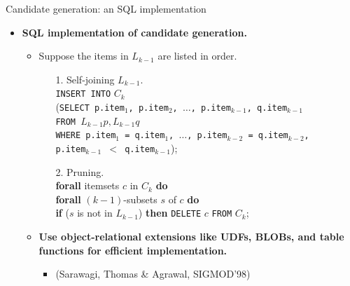 \documentclass[aspectratio=169,t,xcolor=dvipsnames]{beamer}
\begin{document}
  {
    \begin{frame}{Candidate generation: an SQL implementation}
    \begin{itemize}
      \item \textbf{SQL implementation of candidate generation.}
      \begin{itemize}
        \item Suppose the items in $L_{k-1}$ are listed in order.
        \begin{itemize}
          \item[1.] Self-joining $L_{k-1}$.\\
                \texttt{INSERT INTO} $C_k$\\
                \hspace{1cm} (\texttt{SELECT p.item$_1$, p.item$_2$, $\ldots$, p.item$_{k-1}$, q.item$_{k-1}$}\\
                \hspace{1.1cm} \texttt{FROM $L_{k-1} p, L_{k-1} q$}\\
                \hspace{1.1cm} \texttt{WHERE p.item$_1$ = q.item$_1$, $\ldots$, p.item$_{k-2}$ = q.item$_{k-2}$, \\
                \hspace{2.05cm} p.item$_{k-1}$ $<$ q.item$_{k-1}$});
          \item[2.] Pruning.\\
                \hspace{1cm} \textbf{forall} itemsets $c$ in $C_k$ \textbf{do} \\
                \hspace{2cm} \textbf{forall} $(k-1)$-subsets $s$ of $c$ \textbf{do}\\
                \hspace{3cm} \textbf{if} ($s$ is not in $L_{k-1}$) \textbf{then} \texttt{DELETE} $c$ \texttt{FROM} $C_k$;
        \end{itemize}
        \item \textbf{Use object-relational extensions like UDFs, BLOBs, and table functions for efficient implementation.}
        \begin{itemize}
          \item (Sarawagi, Thomas \& Agrawal, SIGMOD'98)
        \end{itemize}
      \end{itemize}
    \end{itemize}
    \end{frame}
  }
\end{document}
